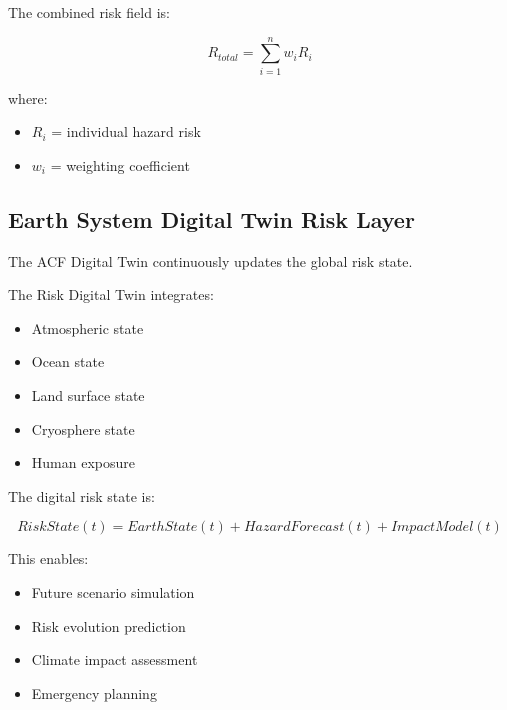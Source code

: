 The combined risk field is:

\[
R_{total}
=
\sum_{i=1}^{n} w_i R_i
\]


where:

\begin{itemize}

\item $R_i$ = individual hazard risk

\item $w_i$ = weighting coefficient

\end{itemize}



\subsection{Earth System Digital Twin Risk Layer}

The ACF Digital Twin continuously updates the global risk state.

The Risk Digital Twin integrates:

\begin{itemize}

\item Atmospheric state

\item Ocean state

\item Land surface state

\item Cryosphere state

\item Human exposure

\end{itemize}


The digital risk state is:

\[
RiskState(t)
=
EarthState(t)
+
HazardForecast(t)
+
ImpactModel(t)
\]


This enables:

\begin{itemize}

\item Future scenario simulation

\item Risk evolution prediction

\item Climate impact assessment

\item Emergency planning

\end{itemize}


